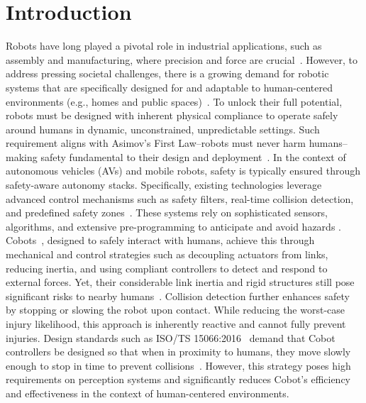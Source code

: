 \section{Introduction}
Robots have long played a pivotal role in industrial applications, such as assembly and manufacturing, where precision and force are crucial~\cite{todd1996fundamentals}.
However, to address pressing societal challenges, there is a growing demand for robotic systems that are specifically designed for and adaptable to human-centered environments (e.g., homes and public spaces)~\cite{nahavandi2019industry, chibani2013ubiquitous, royakkers2015literature}.
To unlock their full potential, robots must be designed with inherent physical compliance to operate safely around humans in dynamic, unconstrained, unpredictable settings.
Such requirement aligns with Asimov's First Law--robots must never harm humans--making safety fundamental to their design and deployment~\cite{villani2018survey}.
%
In the context of autonomous vehicles (AVs) and mobile robots, safety is typically ensured through safety-aware autonomy stacks. 
Specifically, existing technologies leverage advanced control mechanisms such as safety filters, real-time collision detection, and predefined safety zones~\cite{zhao2024potential}. 
These systems rely on sophisticated sensors, algorithms, and extensive pre-programming to anticipate and avoid hazards \cite{fragapane2021planning}. 
\glspl{Cobot}~\cite{el2019cobot}, designed to safely interact with humans, achieve this through mechanical and control strategies such as decoupling actuators from links, reducing inertia, and using compliant controllers to detect and respond to external forces. 
Yet, their considerable link inertia and rigid structures still pose significant risks to nearby humans~\cite{haddadin2013towards}.
Collision detection further enhances safety by stopping or slowing the robot upon contact. While reducing the worst-case injury likelihood, this approach is inherently reactive and cannot fully prevent injuries.
Design standards such as ISO/TS 15066:2016~\cite{Isots_15066_2016} demand that \gls{Cobot} controllers be designed so that when in proximity to humans, they move slowly enough to stop in time to prevent collisions~\cite{ajoudani2018progress, lucci2020combining}. 
However, this strategy poses high requirements on perception systems and significantly reduces \gls{Cobot}'s efficiency and effectiveness in the context of human-centered environments.


